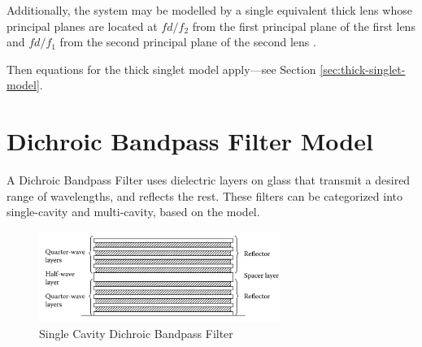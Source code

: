 



Additionally, the system may be modelled by a single equivalent thick lens whose principal planes are located at \(f d / f_2\) from the first principal plane of the first lens and \(f d / f_1\) from the second principal plane of the second lens \cite{Hecht-optics-6.1}.

Then equations for the thick singlet model apply---see Section \ref{sec:thick-singlet-model}.


\section{Dichroic Bandpass Filter Model} 
A Dichroic Bandpass Filter uses dielectric layers on glass that transmit a desired range of wavelengths, and reflects the rest. These filters can be categorized into single-cavity and multi-cavity, based on the model. 
\begin{figure}[H]
    \centering
    \includegraphics[width=0.7\textwidth]{figures/Single_Layer_Dichroic.png}
    \caption{Single Cavity Dichroic Bandpass Filter}
    \label{fig:my_label}
\end{figure}

